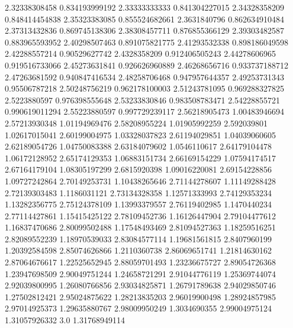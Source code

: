   2.32338308458   0.834193999192
  2.33333333333   0.841304227015
  2.34328358209   0.848414454838
  2.35323383085   0.855524682661
   2.3631840796   0.862634910484
  2.37313432836   0.869745138306
  2.38308457711   0.876855366129
  2.39303482587   0.883965593952
  2.40298507463   0.891075821775
  2.41293532338   0.898186049598
  2.42288557214    0.90529627742
   2.4328358209   0.912406505243
  2.44278606965   0.919516733066
  2.45273631841   0.926626960889
  2.46268656716   0.933737188712
  2.47263681592   0.940847416534
  2.48258706468   0.947957644357
  2.49253731343    0.95506787218
  2.50248756219   0.962178100003
  2.51243781095   0.969288327825
   2.5223880597   0.976398555648
  2.53233830846   0.983508783471
  2.54228855721   0.990619011294
  2.55223880597   0.997729239117
  2.56218905473    1.00483946694
  2.57213930348    1.01194969476
  2.58208955224    1.01905992259
    2.592039801    1.02617015041
  2.60199004975    1.03328037823
  2.61194029851    1.04039060605
  2.62189054726    1.04750083388
  2.63184079602     1.0546110617
  2.64179104478    1.06172128952
  2.65174129353    1.06883151734
  2.66169154229    1.07594174517
  2.67164179104    1.08305197299
   2.6815920398    1.09016220081
  2.69154228856    1.09727242864
  2.70149253731    1.10438265646
  2.71144278607    1.11149288428
  2.72139303483     1.1186031121
  2.73134328358    1.12571333993
  2.74129353234    1.13282356775
  2.75124378109    1.13993379557
  2.76119402985     1.1470440234
  2.77114427861    1.15415425122
  2.78109452736    1.16126447904
  2.79104477612    1.16837470686
  2.80099502488    1.17548493469
  2.81094527363    1.18259516251
  2.82089552239    1.18970539033
  2.83084577114    1.19681561815
   2.8407960199    1.20392584598
  2.85074626866     1.2110360738
  2.86069651741    1.21814630162
  2.87064676617    1.22525652945
  2.88059701493    1.23236675727
  2.89054726368    1.23947698509
  2.90049751244    1.24658721291
  2.91044776119    1.25369744074
  2.92039800995    1.26080766856
  2.93034825871    1.26791789638
  2.94029850746    1.27502812421
  2.95024875622    1.28213835203
  2.96019900498    1.28924857985
  2.97014925373    1.29635880767
  2.98009950249     1.3034690355
  2.99004975124    1.31057926332
            3.0    1.31768949114
